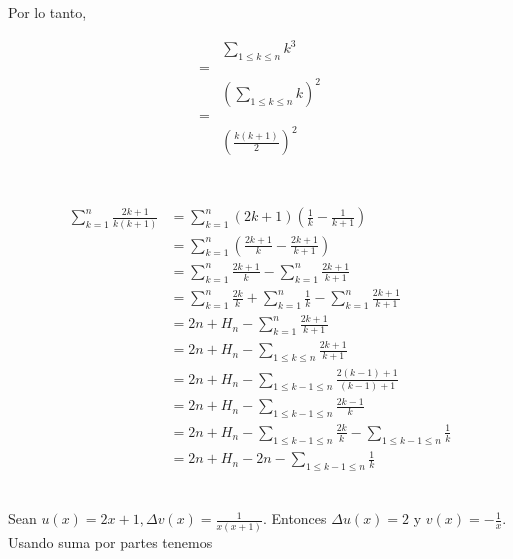 \documentclass{article}
\begin{document}
Por lo tanto,

\begin{align*}
 & \sum_{1 \leq k \leq n} k^3 \\
 = & \\
 & \left(\sum_{1 \leq k \leq n} k \right)^2 \\
 = & \\
 & \left( \frac{k(k+1)}{2} \right)^2 \\
\end{align*}

\section{} %

\subsection{} %

\begin{align*}
\sum_{k=1}^n \frac{2k+1}{k(k+1)} & = \sum_{k=1}^n (2k+1)(\frac{1}{k} - \frac{1}{k+1}) \\ 
  & = \sum_{k=1}^n (\frac{2k+1}{k} - \frac{2k+1}{k+1}) \\ 
  & = \sum_{k=1}^n \frac{2k+1}{k} - \sum_{k=1}^n \frac{2k+1}{k+1} \\
  & = \sum_{k=1}^n \frac{2k}{k} + \sum_{k=1}^n \frac{1}{k} - \sum_{k=1}^n \frac{2k+1}{k+1} \\
  & = 2n + H_n - \sum_{k=1}^n \frac{2k+1}{k+1} \\
  & = 2n + H_n - \sum_{1 \leq k \leq n} \frac{2k+1}{k+1} \\
  & = 2n + H_n - \sum_{1 \leq k-1 \leq n} \frac{2(k-1)+1}{(k-1)+1} \\
  & = 2n + H_n - \sum_{1 \leq k-1 \leq n} \frac{2k-1}{k} \\
  & = 2n + H_n - \sum_{1 \leq k-1 \leq n} \frac{2k}{k} - \sum_{1 \leq k-1 \leq n} \frac{1}{k} \\
  & = 2n + H_n - 2n - \sum_{1 \leq k-1 \leq n} \frac{1}{k} \\
\end{align*}

\subsection{} %

Sean $u(x) = 2x+1, \Delta v(x) = \frac{1}{x(x+1)}$. Entonces $\Delta u(x) = 2$
y $v(x) = -\frac{1}{x}$. Usando suma por partes tenemos
\end{document}
